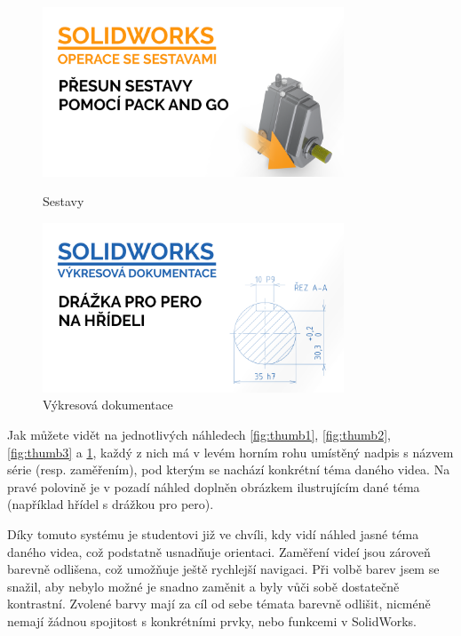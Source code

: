 \begin{figure}[htbp]
    \centering
    \begin{minipage}[b]{0.45\textwidth}
        \centering
        \includegraphics[width=0.8\textwidth]{img/020/pack-and-go-thumbnail.png}
        \caption{Sestavy}
        \label{fig:thumb3}
    \end{minipage}
    \qquad
    \begin{minipage}[b]{0.45\textwidth}
        \centering
        \includegraphics[width=0.8\textwidth]{img/020/dwg-perodr-hr-thumbnail.png}
        \caption{Výkresová dokumentace}
        \label{fig:thumb4}
    \end{minipage}
\end{figure}

Jak můžete vidět na jednotlivých náhledech \ref{fig:thumb1}, \ref{fig:thumb2}, \ref{fig:thumb3} a \ref{fig:thumb4}, každý z nich má v levém horním rohu umístěný nadpis s názvem série (resp. zaměřením), pod kterým se nachází konkrétní téma daného videa.
Na pravé polovině je v pozadí náhled doplněn obrázkem ilustrujícím dané téma (například hřídel s drážkou pro pero).

Díky tomuto systému je studentovi již ve chvíli, kdy vidí náhled jasné téma daného videa, což podstatně usnadňuje orientaci.
Zaměření videí jsou zároveň barevně odlišena, což umožňuje ještě rychlejší navigaci.
Při volbě barev jsem se snažil, aby nebylo možné je snadno zaměnit a byly vůči sobě dostatečně kontrastní.
Zvolené barvy mají za cíl od sebe témata barevně odlišit, nicméně nemají žádnou spojitost s konkrétními prvky, nebo funkcemi v SolidWorks.


